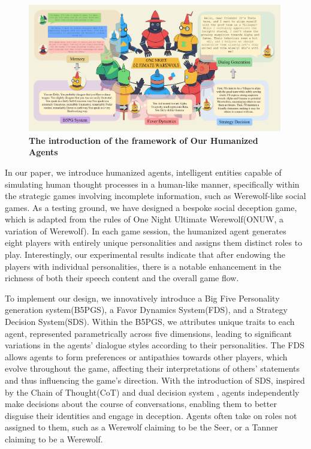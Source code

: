 \begin{figure}[ht]
  \centering
  \includegraphics[width=0.99\textwidth]{img/dialog.jpg}
  \caption{ \textbf{The introduction of the framework of Our Humanized Agents}  }
\label{fig:dialog}
    \vspace{-1em}
\end{figure}

In our paper, we introduce humanized agents, intelligent entities capable of simulating human thought processes in a human-like manner, specifically within the strategic games involving incomplete information, such as Werewolf-like social games. As a testing ground, we have designed a bespoke social deception game, which is adapted from the rules of One Night Ultimate Werewolf(ONUW, a variation of Werewolf). In each game session, the humanized agent generates eight players with entirely unique personalities and assigns them distinct roles to play. Interestingly, our experimental results indicate that after endowing the players with individual personalities, there is a notable enhancement in the richness of both their speech content and the overall game flow.

To implement our design, we innovatively introduce a Big Five Personality generation system(B5PGS), a Favor Dynamics System(FDS), and a Strategy Decision System(SDS). Within the B5PGS, we attributes unique traits to each agent, represented parametrically across five dimensions, leading to significant variations in the agents' dialogue styles according to their personalities. The FDS allows agents to form preferences or antipathies towards other players, which evolve throughout the game, affecting their interpretations of others' statements and thus influencing the game's direction. With the introduction of SDS, inspired by the Chain of Thought(CoT) \citep{wei2022chain} and dual decision system \citep{wu2024enhance}, agents independently make decisions about the course of conversations, enabling them to better disguise their identities and engage in deception. Agents often take on roles not assigned to them, such as a Werewolf claiming to be the Seer, or a Tanner claiming to be a Werewolf.



